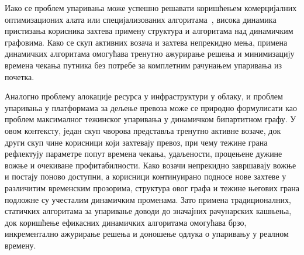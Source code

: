 Иако се проблем упаривања може успешно решавати коришћењем комерцијалних оптимизационих алата или специјализованих алгоритама~\cite{tafreshianTripbasedGraphPartitioning2020}, висока динамика пристизања корисника захтева примену структура и алгоритама над динамичким графовима. Како се скуп активних возача и захтева непрекидно мења, примена динамичких алгоритама омогућава тренутно ажурирање решења и минимизацију времена чекања путника без потребе за комплетним рачунањем упаривања из почетка.

Аналогно проблему алокације ресурса у инфраструктури у облаку, и проблем упаривања у платформама за дељење превоза може се природно формулисати као проблем максималног тежинског упаривања у динамичком бипартитном графу. У овом контексту, један скуп чворова представља тренутно активне возаче, док други скуп чине корисници који захтевају превоз, при чему тежине грана рефлектују параметре попут времена чекања, удаљености, процењене дужине вожње и очекиване профитабилности. Како возачи непрекидно завршавају вожње и постају поново доступни, а корисници континуирано подносе нове захтеве у различитим временским прозорима, структура овог графа и тежине његових грана подложне су учесталим динамичким променама. Зато примена традиционалних, статичких алгоритама за упаривање доводи до значајних рачунарских кашњења, док коришћење ефикасних динамичких алгоритама омогућава брзо, инкрементално ажурирање решења и доношење одлука о упаривању у реалном времену.

